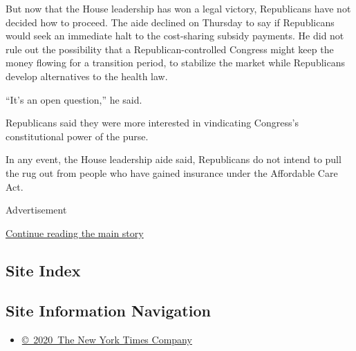But now that the House leadership has won a legal victory, Republicans
have not decided how to proceed. The aide declined on Thursday to say if
Republicans would seek an immediate halt to the cost-sharing subsidy
payments. He did not rule out the possibility that a
Republican-controlled Congress might keep the money flowing for a
transition period, to stabilize the market while Republicans develop
alternatives to the health law.

``It's an open question,'' he said.

Republicans said they were more interested in vindicating Congress's
constitutional power of the purse.

In any event, the House leadership aide said, Republicans do not intend
to pull the rug out from people who have gained insurance under the
Affordable Care Act.

Advertisement

\protect\hyperlink{after-bottom}{Continue reading the main story}

\hypertarget{site-index}{%
\subsection{Site Index}\label{site-index}}

\hypertarget{site-information-navigation}{%
\subsection{Site Information
Navigation}\label{site-information-navigation}}

\begin{itemize}
\tightlist
\item
  \href{https://help.nytimes3xbfgragh.onion/hc/en-us/articles/115014792127-Copyright-notice}{©~2020~The
  New York Times Company}
\end{itemize}

